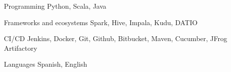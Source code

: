 

\begin{cvskills}

  \cvskill
    {Programming} %
    {Python, Scala, Java} %

  \cvskill
    {Frameworks and ecosystems} %
    {Spark, Hive, Impala, Kudu, DATIO} %

  \cvskill
    {CI/CD} %
    {Jenkins, Docker, Git, Github, Bitbucket, Maven, Cucumber, JFrog Artifactory} %

  \cvskill
    {Languages} %
    {Spanish, English} %

\end{cvskills}
